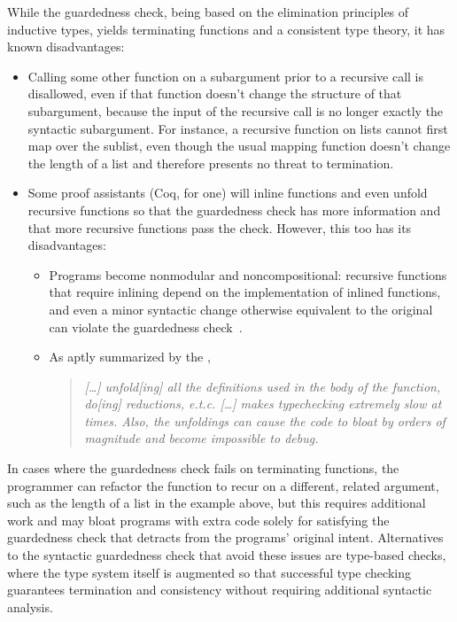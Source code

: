 While the guardedness check, being based on the elimination principles of inductive types,
yields terminating functions and a consistent type theory,
it has known disadvantages:
%
\begin{itemize}
  \item Calling some other function on a subargument prior to a recursive call is disallowed,
    even if that function doesn't change the structure of that subargument,
    because the input of the recursive call is no longer exactly the syntactic subargument.
    For instance, a recursive function on lists cannot first map over the sublist,
    even though the usual mapping function doesn't change the length of a list
    and therefore presents no threat to termination.
  \item Some proof assistants (Coq, for one) will inline functions and even unfold recursive functions
    so that the guardedness check has more information
    and that more recursive functions pass the check.
    However, this too has its disadvantages:
    \begin{itemize}
      \item Programs become nonmodular and noncompositional:
        recursive functions that require inlining
        depend on the implementation of inlined functions,
        and even a minor syntactic change otherwise equivalent to the original
        can violate the guardedness check~\citep{CIC-hat-minus}.
      \item As aptly summarized by the \citet{coqterm},
        \begin{quote}
        \begin{singlespace}
        \textit{{\rm [\ldots]} unfold{\rm [ing]} all the definitions used in the body of the function, do{\rm [ing]} reductions, e.t.c.
        {\rm [\ldots]} makes typechecking extremely slow at times.
        Also, the unfoldings can cause the code to bloat by orders of magnitude and become impossible to debug.}
        \end{singlespace}
        \end{quote}
    \end{itemize}
\end{itemize}

In cases where the guardedness check fails on terminating functions,
the programmer can refactor the function to recur on a different, related argument,
such as the length of a list in the example above,
but this requires additional work and may bloat programs
with extra code solely for satisfying the guardedness check
that detracts from the programs' original intent.
Alternatives to the syntactic guardedness check that avoid these issues are type-based checks,
where the type system itself is augmented so that successful type checking
guarantees termination and consistency without requiring additional syntactic analysis.

